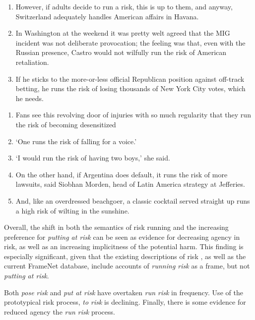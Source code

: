     \begin{multicols}{2}

    \begin{enumerate} [before=\color{black}\ttfamily]  \setlength\itemsep{0em} \small
    \item However, if adults decide to run a risk, this is up to them, and anyway, Switzerland adequately handles American affairs in Havana.
    \item In Washington at the weekend it was pretty welt agreed that the MIG incident was not deliberate provocation; the feeling was that, even with the Russian presence, Castro would not wilfully run the risk of American retaliation.
    \item  If he sticks to the more-or-less official Republican position against off-track betting, he runs the risk of losing thousands of New York City votes, which he needs.
    \end{enumerate}
    \begin{enumerate} [before=\color{black}\ttfamily]   \setlength\itemsep{0em} \small
    \item Fans see this revolving door of injuries with so much regularity that they run the risk of becoming desensitized 
    \item `One runs the risk of falling for a voice.'
    \item `I would run the risk of having two boys,' she said.
    \item On the other hand, if Argentina does default, it runs the risk of more lawsuits, said Siobhan Morden, head of Latin America strategy at Jefferies.
    \item And, like an overdressed beachgoer, a classic cocktail served straight up runs a high risk of wilting in the sunshine.
    \end{enumerate}
    \end{multicols}
    \noindent Overall, the shift in both the semantics of risk running and the increasing preference for \emph{putting at risk} can be seen as evidence for decreasing agency in risk, as well as an increasing implicitness of the potential harm. This finding is especially significant, given that the existing descriptions of risk \cite{fillmore_toward_1992}, as well as the current FrameNet database, include accounts of \emph{running risk} as a frame, but not \emph{putting at risk}.

    \vspace{5mm}\noindent\begin{tcolorbox}[colback=yellow!5,colframe=yellow!40!black,title=Summary: types of risk processes]
    \parbox{1\textwidth}{%
    Both \emph{pose risk} and \emph{put at risk} have overtaken \emph{run risk} in frequency. Use of the prototypical risk process, \emph{to risk} is declining. Finally, there is some evidence for reduced agency the \emph{run risk} process.}
    \end{tcolorbox}
    \vspace{5mm}
    
